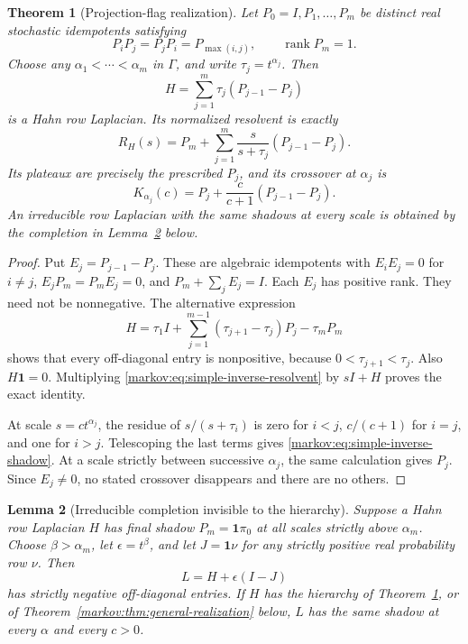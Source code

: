 \documentclass[11pt]{article}
\numberwithin{equation}{section}
\newtheorem{theorem}{Theorem}[section]
\newtheorem{lemma}[theorem]{Lemma}
\theoremstyle{definition}
\theoremstyle{remark}
\newcommand{\one}{\mathbf 1}
\newcommand{\rank}{\operatorname{rank}}
\begin{document}
\begin{theorem}[Projection-flag realization]\label{markov:thm:flag-realization}
Let $P_0=I,P_1,\ldots,P_m$ be distinct real stochastic idempotents satisfying
\[
 P_iP_j=P_jP_i=P_{\max(i,j)},\qquad \rank P_m=1.
\]
Choose any $\alpha_1<\cdots<\alpha_m$ in $\Gamma$, and write
$\tau_j=t^{\alpha_j}$. Then
\begin{equation}\label{markov:eq:simple-inverse}
 H=\sum_{j=1}^m\tau_j(P_{j-1}-P_j)
\end{equation}
is a Hahn row Laplacian. Its normalized resolvent is exactly
\begin{equation}\label{markov:eq:simple-inverse-resolvent}
 R_H(s)=P_m+\sum_{j=1}^m\frac{s}{s+\tau_j}(P_{j-1}-P_j).
\end{equation}
Its plateaux are precisely the prescribed $P_j$, and its crossover at $\alpha_j$
is
\begin{equation}\label{markov:eq:simple-inverse-shadow}
 K_{\alpha_j}(c)=P_j+\frac{c}{c+1}(P_{j-1}-P_j).
\end{equation}
An irreducible row Laplacian with the same shadows at \emph{every} scale is
obtained by the completion in Lemma~\ref{markov:lem:completion} below.
\end{theorem}

\begin{proof}
Put $E_j=P_{j-1}-P_j$. These are algebraic idempotents with
$E_iE_j=0$ for $i\ne j$, $E_jP_m=P_mE_j=0$, and
$P_m+\sum_jE_j=I$. Each $E_j$ has positive rank. They need not be nonnegative.
The alternative expression
\begin{equation}\label{markov:eq:inverse-signs}
 H=\tau_1I+\sum_{j=1}^{m-1}(\tau_{j+1}-\tau_j)P_j-\tau_mP_m
\end{equation}
shows that every off-diagonal entry is nonpositive, because
$0<\tau_{j+1}<\tau_j$. Also $H\one=0$. Multiplying
\eqref{markov:eq:simple-inverse-resolvent} by $sI+H$ proves the exact identity.

At scale $s=ct^{\alpha_j}$, the residue of $s/(s+\tau_i)$ is zero for $i<j$,
$c/(c+1)$ for $i=j$, and one for $i>j$. Telescoping the last terms gives
\eqref{markov:eq:simple-inverse-shadow}. At a scale strictly between successive
$\alpha_j$, the same calculation gives $P_j$. Since $E_j\ne0$, no stated
crossover disappears and there are no others.
\end{proof}

\begin{lemma}[Irreducible completion invisible to the hierarchy]\label{markov:lem:completion}
Suppose a Hahn row Laplacian $H$ has final shadow $P_m=\one\pi_0$ at all scales
strictly above $\alpha_m$. Choose $\beta>\alpha_m$, let $\epsilon=t^\beta$, and
let $J=\one\nu$ for any strictly positive real probability row $\nu$. Then
\begin{equation}\label{markov:eq:completion}
 L=H+\epsilon(I-J)
\end{equation}
has strictly negative off-diagonal entries. If $H$ has the hierarchy of
Theorem~\ref{markov:thm:flag-realization}, or of
Theorem~\ref{markov:thm:general-realization} below, $L$ has the same shadow at every
$\alpha$ and every $c>0$.
\end{lemma}
\end{document}
